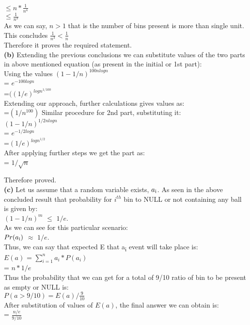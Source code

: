 \documentclass[11pt]{article}
\renewcommand\part[1]{\vspace{.10in}\textbf{(#1)}}
\begin{document}
$\leq n*\frac{1}{n^4}$\\

$\leq \frac{1}{n^3}$\\

As we can say, $n>1$ that is the number of bins present is more than single unit.\\
This concludes $\frac{1}{n^3}<\frac{1}{n}$\\

Therefore it proves the required statement.\\[20pt]

\part{b} 
Extending the previous conclusions we can substitute values of the two parts in above mentioned equation (as present in the initial or 1st part):\\
Using the values $(1-1/n)^{100n logn}$\\
= $e^{-100 logn}$\\
=$ ((1/e)^{logn  ^{1/100}}$\\
Extending our approach, further calculations gives values as:\\
=$ (1/n^{100})$
Similar procedure for 2nd part, substituting it:\\

$(1-1/n)^{1/2nlogn}$\\
= $e^{-1/2logn}$\\
=$(1/e)^{logn ^{1/2}}$\\

After applying further steps we get the part as:\\
= $1/\sqrt{n}$

Therefore proved.\\[20pt]

\part{c}
Let us assume that a random variable exists, $a\textsubscript{i}$. As seen in the above concluded result that probability for $i^{th}$ bin to NULL or not containing any ball is given by:\\
  $(1 - 1/n)^ {m}$ $\leq$ $1/e$. \\
As we can see for this particular scenario:\\ 
$Pr(a\textsubscript{i})$ $\approx$ $1/e$.\\   

Thus, we can say that expected E that  a\textsubscript{i} event will take place is:\\
$E(a)$ =  $\sum_{i = 1}^n a_i * P(a_i)$ \\
 = $n * 1/e$\\
Thus the probability that we can get for a total of 9/10 ratio of bin to be present as empty or NULL is:\\
$P(a > {9}/{10}) = {E(a)/ {\frac{9} {10}} }$\\
After substitution of values of $E(a)$, the final answer we can obtain is:\\
 =  $\frac{n/e} {9/10}$\\[20pt]
\end{document}
